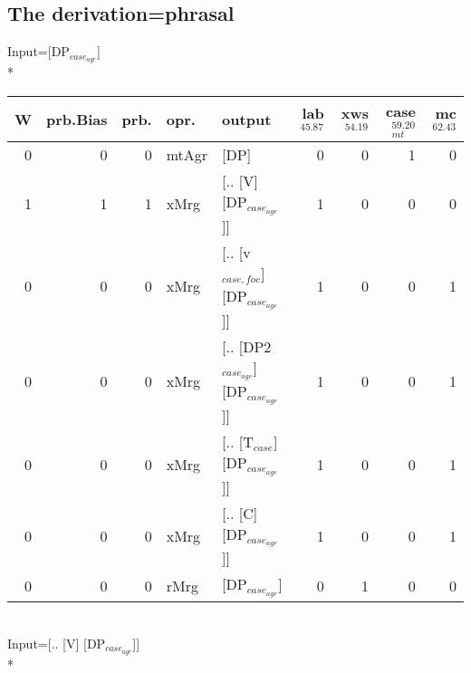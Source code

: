 \subsection{The derivation=phrasal}
\begingroup\scriptsize Input=[DP$_{case_{agr}}$]\\*
\begin{tabularx}{\linewidth}{rrrlXrrrr}
\hline
   W &   prb.Bias &   prb. & opr.    & output                            &   lab$^{45.87}$ &   xws$^{54.19}$ &   case$_{mt}^{59.20}$ &   mc$^{62.43}$ \\
\hline
   0 &       0 &   0 & mtAgr & [DP]                              &             0 &             0 &                 1 &            0 \\
   1 &       1 &   1 & xMrg  & [.. [V] [DP$_{case_{agr}}$]]            &             1 &             0 &                 0 &            0 \\
   0 &       0 &   0 & xMrg  & [.. [v$_{case,foc}$] [DP$_{case_{agr}}$]]   &             1 &             0 &                 0 &            1 \\
   0 &       0 &   0 & xMrg  & [.. [DP2$_{case_{agr}}$] [DP$_{case_{agr}}$]] &             1 &             0 &                 0 &            1 \\
   0 &       0 &   0 & xMrg  & [.. [T$_{case}$] [DP$_{case_{agr}}$]]       &             1 &             0 &                 0 &            1 \\
   0 &       0 &   0 & xMrg  & [.. [C] [DP$_{case_{agr}}$]]            &             1 &             0 &                 0 &            1 \\
   0 &       0 &   0 & rMrg  & [DP$_{case_{agr}}$]                     &             0 &             1 &                 0 &            0 \\
\hline
\end{tabularx}\endgroup\\
\begingroup\scriptsize Input=[.. [V] [DP$_{case_{agr}}$]]\\*
